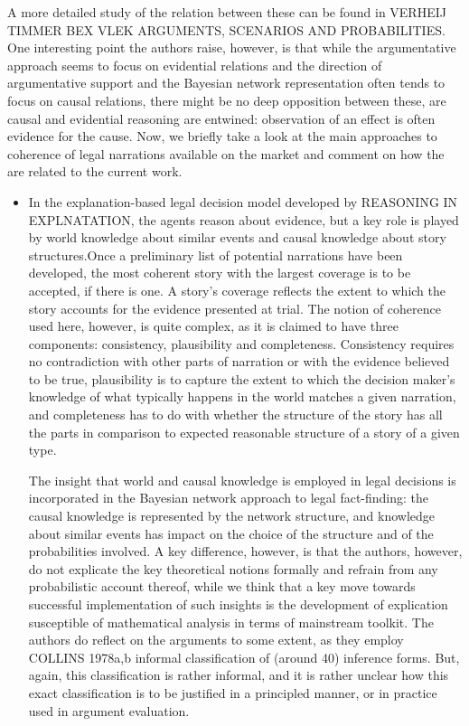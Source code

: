 \documentclass[10pt,]{scrartcl}
\begin{document}
\noindent A more detailed study of the relation between these can be found in VERHEIJ TIMMER BEX VLEK  ARGUMENTS, SCENARIOS AND PROBABILITIES. One interesting point the authors raise, however, is that while the argumentative approach seems to focus on evidential relations and the direction of argumentative support and the Bayesian network representation often tends to focus on causal relations, there might be no deep opposition between these, are causal and evidential reasoning are entwined: observation of an  effect is often evidence for the cause. 
Now, we briefly take a look at the main approaches to coherence of legal narrations available on the market and comment on how the are related to the current work.

\begin{itemize}
\item{  In the explanation-based legal decision model developed by REASONING IN EXPLNATATION, the agents reason about evidence, but a key role is played by world knowledge about similar events and causal knowledge about story structures.Once a preliminary list of potential narrations have been developed, the most coherent story with the largest coverage is to be accepted, if there is one. A story's coverage reflects the extent to which the story accounts for the evidence presented at trial. The notion of coherence used here, however, is quite complex, as it is claimed to have three components: consistency, plausibility and completeness. Consistency requires no contradiction with other parts of narration or with the evidence believed to be true, plausibility is to capture the extent to which the decision maker's knowledge of what typically happens in the world matches a given narration, and completeness has to do with whether the structure of the story has all the parts in comparison to expected reasonable structure of a story of a given type. 



 The insight that world and causal knowledge is employed in legal decisions is incorporated in the Bayesian network approach to legal fact-finding: the causal knowledge is represented by the network structure, and knowledge about similar events has impact on the choice of the structure and of the probabilities involved. A key difference, however, is that  the authors, however, do not explicate the key theoretical  notions formally and refrain from any probabilistic account thereof, while we think that a key move towards successful implementation of such insights is the development of explication susceptible of mathematical analysis in terms of mainstream toolkit.  The authors do reflect on the arguments to some extent,  as they employ COLLINS 1978a,b informal classification of (around 40) inference forms. But,   again, this classification is rather informal, and it is rather unclear how this exact classification is to be justified in a principled manner, or in practice used in argument evaluation. 

}
\end{itemize}
\end{document}
